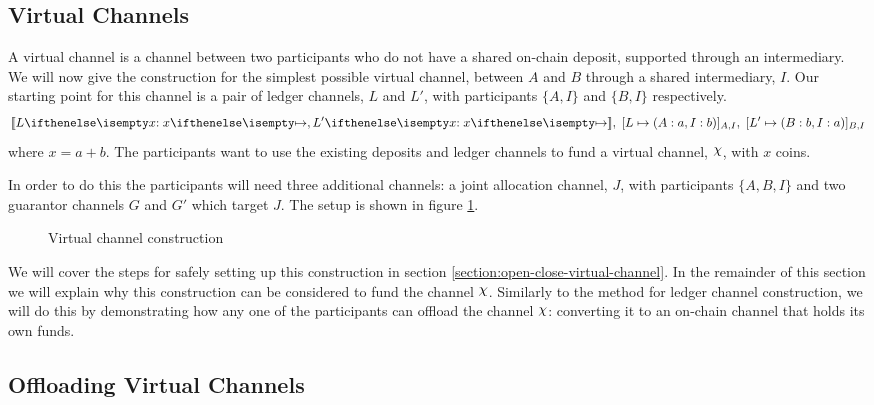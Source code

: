 \documentclass{article}
\begin{document}
\subsection{Virtual Channels}

A virtual channel is a channel between two participants who do not have a shared on-chain deposit, supported through an intermediary.
We will now give the construction for the simplest possible virtual channel, between $A$ and $B$ through a shared intermediary, $I$.
Our starting point for this channel is a pair of ledger channels, $L$ and $L'$, with participants $\{A,I\}$ and $\{B,I\}$ respectively.
\begin{align}
  \adj{\holds{L}{x}{}, \holds{L'}{x}{}}, \; \finalizable{L}{\alloc{A:a, I:b}}{A, I}, \; \finalizable{L'}{\alloc{B: b, I: a}}{B, I} \label{eq:virtual-channel-start-state}
\end{align}
where $x = a + b$.
The participants want to use the existing deposits and ledger channels to fund a virtual channel, $\rchi$, with $x$ coins.

In order to do this the participants will need three additional channels: a joint allocation channel, $J$, with participants $\{A, B, I\}$ and two guarantor channels $G$ and $G'$ which target $J$. The setup is shown in figure \ref{fig:virtual-channel-construction}.

\begin{figure}[ht]
  \centering
  
  \caption{Virtual channel construction}
  \label{fig:virtual-channel-construction}
\end{figure}

We will cover the steps for safely setting up this construction in section \ref{section:open-close-virtual-channel}. 
In the remainder of this section we will explain why this construction can be considered to fund the channel $\rchi$.
Similarly to the method for ledger channel construction, we will do this by demonstrating how any one of the participants can offload the channel $\rchi$: converting it to an on-chain channel that holds its own funds.

\subsection{Offloading Virtual Channels}
\end{document}
